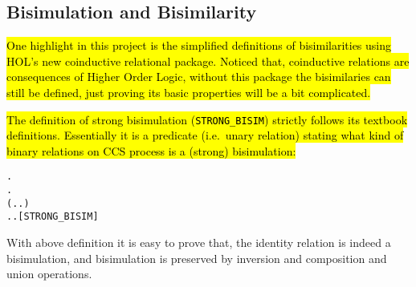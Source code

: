 
\subsection{Bisimulation and Bisimilarity}

\hl{One highlight in this project is the simplified definitions of
  bisimilarities using HOL's new coinductive relational package.  Noticed that,
  coinductive relations are consequences of Higher Order Logic,
  without this package the bisimilaries can still be defined, just
  proving its basic properties will be a bit complicated.}

\hl{The definition of strong bisimulation (\texttt{STRONG_BISIM}) strictly follows
  its textbook definitions. Essentially it is a predicate (i.e.~unary relation) stating
what kind of binary relations on CCS process is a (strong) bisimulation:}
\begin{alltt}
  \HOLSymConst{\HOLTokenEquiv{}}
\HOLSymConst{\HOLTokenForall{}} .
       \HOLSymConst{\HOLTokenImp{}}
    \HOLSymConst{\HOLTokenForall{}}.
        (\HOLSymConst{\HOLTokenForall{}}.  \HOLTokenTransBegin{}\HOLTokenTransEnd {} \HOLSymConst{\HOLTokenImp{}} \HOLSymConst{\HOLTokenExists{}}.  \HOLTokenTransBegin{}\HOLTokenTransEnd {} \HOLSymConst{\HOLTokenConj{}}   ) \HOLSymConst{\HOLTokenConj{}}
        \HOLSymConst{\HOLTokenForall{}}.  \HOLTokenTransBegin{}\HOLTokenTransEnd {} \HOLSymConst{\HOLTokenImp{}} \HOLSymConst{\HOLTokenExists{}}.  \HOLTokenTransBegin{}\HOLTokenTransEnd {} \HOLSymConst{\HOLTokenConj{}}   \hfill{[STRONG_BISIM]}
\end{alltt}
With above definition it is easy to prove that, the identity
relation is indeed a bisimulation, and bisimulation is preserved by inversion
and composition and union operations.

